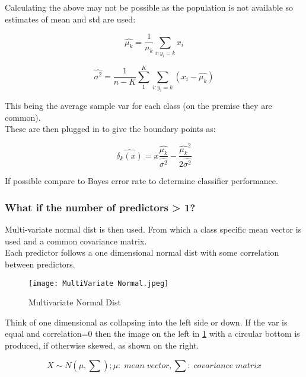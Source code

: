 \documentclass[11pt]{scrartcl} %
\begin{document}
Calculating the above may not be possible as the population is not available so estimates of mean and std are used:

\begin{equation}
	\hat{\mu_k} = \frac{1}{n_k}\sum_{i:y_i=k}{x_i}
\end{equation}


\begin{equation}
	\hat{\sigma^2}  = \frac{1}{n-K}\sum^K_1\sum_{i:y_i=k}(x_i - \hat{\mu_k})
\end{equation}

This being the average sample var for each class (on the premise they are common).\\

These are then plugged in to give the boundary points as:

\begin{equation}
	\hat{\delta_k(x)} = x\frac{\hat{\mu_k}}{\hat{\sigma^2}} - \frac{\hat{\mu_k}^2}{2\hat{\sigma^2}}
\end{equation}

If possible compare to Bayes error rate to determine classifier performance.

\subsubsection{What if the number of predictors > 1?}

Multi-variate normal dist is then used. From which a class specific mean vector is used and a common covariance matrix.\\

Each predictor follows a one dimensional normal dist with some correlation between predictors.

\begin{figure}[h] %
	\centering
	\texttt{[image: MultiVariate Normal.jpeg]} %
	\caption{Multivariate Normal Dist}
	\label{multi-normal}
\end{figure}

Think of one dimensional as collapsing into the left side or down. If the var is equal and correlation=0
then the image on the left in \ref{multi-normal} with a circular bottom is produced, if otherwise skewed,
as shown on the right.

\begin{equation}
	X \sim N(\mu,\sum); \mu:\; mean\; vector, \sum:\; covariance\; matrix
\end{equation}
\end{document}
